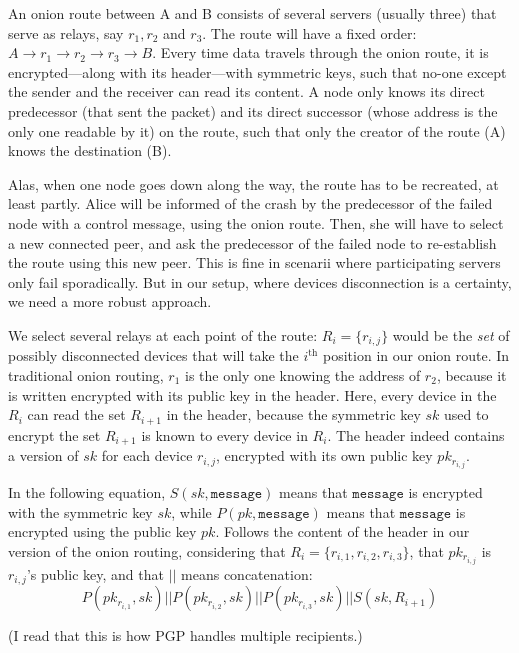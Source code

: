 An onion route between A and B consists of several servers (usually three) that serve as relays, say $r_1, r_2$ and $r_3$. 
The route will have a fixed order: $A \rightarrow r_1 \rightarrow r_2 \rightarrow r_3 \rightarrow B$.
Every time data travels through the onion route, it is encrypted---along with its header---with symmetric keys, such that no-one except the sender and the receiver can read its content.
A node only knows its direct predecessor (that sent the packet) and its direct successor (whose address is the only one readable by it) on the route, such that only the creator of the route (A) knows the destination (B).

Alas, when one node goes down along the way, the route has to be recreated, at least partly.
Alice will be informed of the crash by the predecessor of the failed node with a control message, using the onion route.
Then, she will have to select a new connected peer, and ask the predecessor of the failed node to re-establish the route using this new peer.
This is fine in scenarii where participating servers only fail sporadically.
But in our setup, where devices disconnection is a certainty, we need a more robust approach.

We select several relays at each point of the route: $R_i=\{r_{i,j}\}$ would be 
the \emph{set} of possibly disconnected devices that will take the 
$i^{\text{th}}$ position in our onion route.
In traditional onion routing, $r_1$ is the only one knowing the address of $r_2$, because it is written encrypted with its public key in the header.
Here, every device in the $R_i$ can read the set $R_{i+1}$ in the header, because the symmetric key $sk$ used to encrypt the set $R_{i+1}$ is known to every device in $R_i$.
The header indeed contains a version of $sk$ for each device $r_{i,j}$, encrypted with its own public key $pk_{r_{i,j}}$.

In the following equation, $S(sk,\texttt{message})$ means that $\texttt{message}$ is encrypted with the symmetric key $sk$, while $P(pk, \texttt{message})$ means that $\texttt{message}$ is encrypted using the public key $pk$.
Follows the content of the header in our version of the onion routing, considering that $R_i=\{r_{i,1}, r_{i,2}, r_{i,3}\}$, that $pk_{r_{i,j}}$ is $r_{i,j}$'s public key, and that $||$ means concatenation:
\[
  P(pk_{r_{i,1}}, sk) || P(pk_{r_{i,2}}, sk) || P(pk_{r_{i,3}}, sk) || S(sk, 
  R_{i+1})
\]

(I read that this is how PGP handles multiple recipients.)



